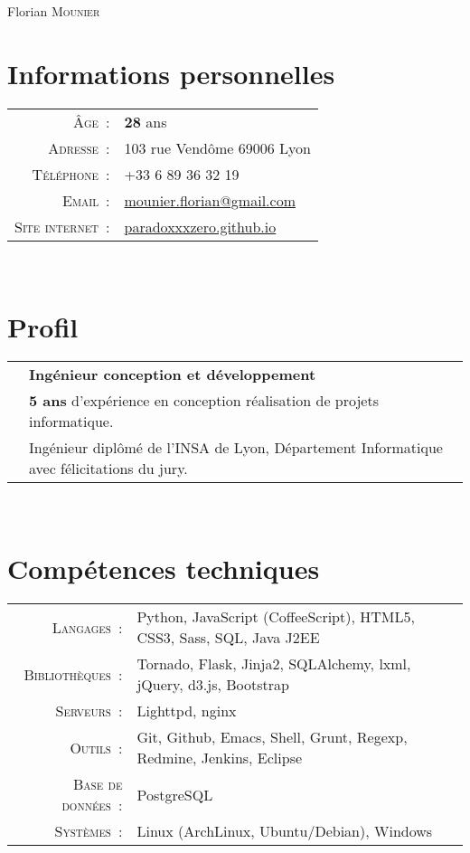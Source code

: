 \documentclass[a4paper,10pt]{article}
\begin{document}
\pagestyle{empty}
\par{\centering
  {\Huge Florian \textsc{Mounier}
  }\bigskip\par}

\section{Informations personnelles}
\begin{tabular}{rl}
  \textsc{Âge :}           & \textbf{28} ans \\
  \textsc{Adresse :}       & 103 rue Vendôme 69006 Lyon \\
  \textsc{Téléphone :}     & +33 6 89 36 32 19 \\
  \textsc{Email :}         & \href{mailto:mounier.florian@gmail.com}{mounier.florian@gmail.com} \\
  \textsc{Site internet :} & \href{http://paradoxxxzero.github.com}{paradoxxxzero.github.io} \\
\end{tabular} \\

\section{Profil}
\begin{tabular}{rl}
  & \textbf {Ingénieur conception et développement} \\
  & \textbf{5 ans} d’expérience en conception réalisation de projets informatique. \\
  & Ingénieur diplômé de l’INSA de Lyon, Département Informatique avec félicitations du jury. \\
\end{tabular} \\

\section{Compétences techniques}
\begin{tabular}{rl}
  \textsc{Langages :}        & Python, JavaScript (CoffeeScript), HTML5, CSS3, Sass, SQL, Java J2EE \\
  \textsc{Bibliothèques :}   & Tornado, Flask, Jinja2, SQLAlchemy, lxml, jQuery, d3.js, Bootstrap \\
  \textsc{Serveurs :}        & Lighttpd, nginx \\
  \textsc{Outils :}          & Git, Github, Emacs, Shell, Grunt, Regexp, Redmine, Jenkins, Eclipse \\
  \textsc{Base de données :} & PostgreSQL \\
  \textsc{Systèmes :}        & Linux (ArchLinux, Ubuntu/Debian), Windows \\
\end{tabular} \\
\end{document}
